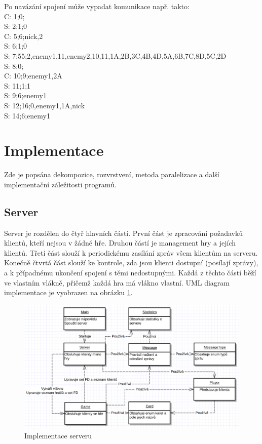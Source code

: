 \documentclass[12pt, a4paper]{article}
\begin{document}
		Po navázání spojení může vypadat komunikace např. takto:\\
		C: 1;0;\\
		S: 2;1;0\\
		C: 5;6;nick,2\\
		S: 6;1;0\\
		S: 7;55;2,enemy1,11,enemy2,10,11,1A,2B,3C,4B,4D,5A,6B,7C,8D,5C,2D\\
		S: 8;0;\\
		C: 10;9;enemy1,2A\\
		S: 11;1;1\\
		S: 9;6;enemy1\\
		S: 12;16;0,enemy1,1A,nick\\
		S: 14;6;enemy1
		
	\section{Implementace}
	Zde je popsána dekompozice, rozvrstvení, metoda paralelizace a další implementační záležitosti programů.
	
		\subsection{Server}
		Server je rozdělen do čtyř hlavních částí. První část je zpracování požadavků klientů, kteří nejsou v žádné hře. Druhou částí je management hry a jejích klientů. Třetí část slouží k periodickému zasílání  zpráv všem klientům na serveru. Konečně čtvrtá část slouží ke kontrole, zda jsou klienti dostupní (posílají  zprávy), a k případnému ukončení spojení s těmi nedostupnými. Každá z těchto částí běží ve vlastním vlákně, přičemž každá hra má vlákno vlastní. UML diagram implementace je vyobrazen na obrázku \ref{Server}.
		\begin{figure}[ht!]
			\centering
			\caption{Implementace serveru}
			\label{Server}
			\includegraphics[width=13cm]{img/Server.png}
		\end{figure}
	
\end{document}
